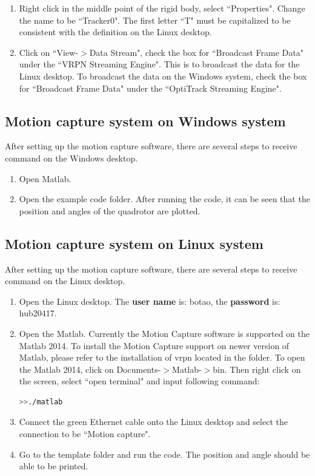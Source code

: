 \documentclass[idxtotoc,hyperref,openany]{labbook} %
\begin{document}
\begin{enumerate}
\item Right click in the middle point of the rigid body, select ``Properties". Change the name to be ``Tracker0". The first letter ``T" must be capitalized to be consistent with the definition on the Linux desktop.
\item Click on ``View-$>$Data Stream", check the box for ``Broadcast Frame Data" under the ``VRPN Streaming Engine". This is to broadcast the data for the Linux desktop. To broadcast the data on the Windows system, check the box for  ``Broadcast Frame Data" under the ``OptiTrack Streaming Engine". 
\end{enumerate} 



\subsection{Motion capture system on Windows system}
After setting up the motion capture software, there are several steps to receive command on the Windows desktop. 

\begin{enumerate}
\item Open Matlab. 
\item Open the example code folder. After running the code, it can be seen that the position and angles of the quadrotor are plotted. 
\end{enumerate}
\subsection{Motion capture system on Linux system}
After setting up the motion capture software, there are several steps to receive command on the Linux desktop. 

\begin{enumerate}
\item Open the Linux desktop. The \textbf{user name} is: botao, the \textbf{password} is: hub20417.
\item Open the Matlab. Currently the Motion Capture software is supported on the Matlab 2014. To install the Motion Capture support on newer version of Matlab, please refer to the installation of vrpn located in the folder. To open the Matlab 2014, click on Documents-$>$Matlab-$>$bin. Then right click on the screen, select ``open terminal" and input following command:
\begin{lstlisting}[language=bash]
>>./matlab
\end{lstlisting}
\item Connect the green Ethernet cable onto the Linux desktop and select the connection to be ``Motion capture". 
\item Go to the template folder and run the code. The position and angle should be able to be printed.  
\end{enumerate}
\end{document}
